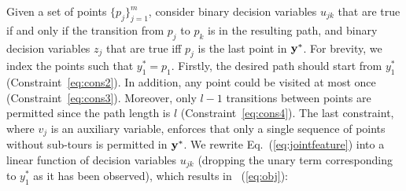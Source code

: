 \begin{wraptable}{r}{0.56\linewidth}
\end{wraptable}

Given a set of points $\{p_j\}_{j=1}^m$, 
consider binary decision variables $u_{jk}$ that are true if and only if
the transition from $p_j$ to $p_k$ is in the resulting path,
and binary decision variables $z_j$ that are true iff $p_j$ is the last point in $\mathbf{y}^*$.
For brevity, we index the points such that $y_1^* = p_1$.
Firstly, the desired path should start from $y_1^*$ (Constraint~\ref{eq:cons2}).
In addition, any point could be visited at most once (Constraint~\ref{eq:cons3}).
Moreover, only $l-1$ transitions between points are permitted
since the path length is $l$ (Constraint~\ref{eq:cons4}).
The last constraint, where $v_j$ is an auxiliary variable,
enforces that only a single sequence of points without sub-tours is permitted in $\mathbf{y}^*$.
We rewrite Eq.~(\ref{eq:jointfeature}) into a linear function of decision variables $u_{jk}$
(dropping the unary term corresponding to $y_1^*$ as it has been observed), which results in ~(\ref{eq:obj}):

